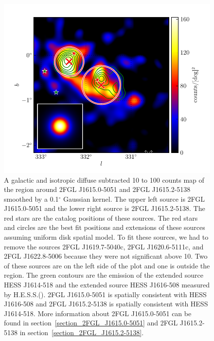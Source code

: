 \documentclass[12pt,preprint]{aastex}
\newcommand{\gev}{\text{GeV}\xspace}
\newcommand{\tev}{\text{TeV}\xspace}
\renewcommand{\deg}{\ensuremath{^\circ}\xspace}
\begin{document}
\begin{figure}
  \begin{center}
    \includegraphics[type=pdf,ext=.pdf,read=.pdf]{source_plots/source_1FGL_J1613.6-5100c}
  \end{center}
  \caption{
    A galactic and isotropic diffuse subtracted 10 \gev to 100 \gev counts
    map of the region around 2FGL J1615.0-5051 and 2FGL J1615.2-5138
    smoothed by a 0.1\deg Gaussian kernel. The upper left source is
    2FGL J1615.0-5051 and the lower right source is 2FGL J1615.2-5138.
    The red stars are the catalog positions of these sources.  The red
    stars and circles are the best fit positions and extensions
    of these sources assuming uniform disk spatial model.  To fit these
    sources, we had to remove 
    the sources 2FGL J1619.7-5040c, 2FGL J1620.6-5111c, and 2FGL
    J1622.8-5006 because they were not significant above 10\gev. Two
    of these sources are on the left side of the plot and one is
    outside the region.  The green contours are the \tev emission of
    the extended source HESS J1614-518 and the extended source HESS
    J1616-508 measured by H.E.S.S.(\cite{HESS_plane_survey}). 2FGL
    J1615.0-5051 is spatially
    consistent with HESS J1616-508 and 2FGL J1615.2-5138 is spatially
    consistent with HESS J1614-518.  More information about 2FGL
    J1615.0-5051 can be found in section~\ref{section_2FGL_J1615.0-5051} and
    2FGL J1615.2-5138 in section~\ref{section_2FGL_J1615.2-5138}.
  }\label{1FGL_J1613.6-5100c}
\end{figure}
\end{document}
